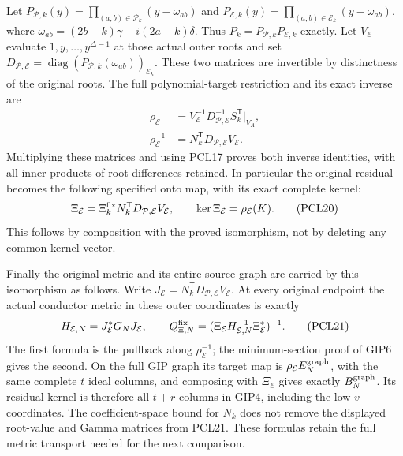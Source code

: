 Let
$P_{\mathcal P,k}(y)=\prod_{(a,b)\in\mathcal P_k}(y-\omega_{ab})$
and $P_{\mathcal E,k}(y)=\prod_{(a,b)\in\mathcal E_k}(y-\omega_{ab})$,
where $\omega_{ab}=(2b-k)\gamma-i(2a-k)\delta$. Thus
$P_k=P_{\mathcal P,k}P_{\mathcal E,k}$ exactly. Let
$V_{\mathcal E}$ evaluate $1,y,\ldots,y^{\Delta-1}$ at those
actual outer roots and set
$D_{\mathcal P,\mathcal E}=\operatorname{diag}
(P_{\mathcal P,k}(\omega_{ab}))_{\mathcal E_k}$. These two matrices
are invertible by distinctness of the original roots. The full
polynomial-target restriction and its exact inverse are
\[
 \begin{split}
 \rho_{\mathcal E}
 &=V_{\mathcal E}^{-1}D_{\mathcal P,\mathcal E}^{-1}
                         S_k^{\mathsf T}|_{V_A},\\
 \rho_{\mathcal E}^{-1}
 &=N_k^{\mathsf T}D_{\mathcal P,\mathcal E}V_{\mathcal E}.
 \end{split}\tag{PCL19}
\]
Multiplying these matrices and using PCL17 proves both inverse
identities, with all inner products of root differences retained.
In particular the original residual becomes the following
specified onto map, with its exact complete kernel:
\[
 \Xi_{\mathcal E}=\Xi_k^{\rm fix}
       N_k^{\mathsf T}D_{\mathcal P,\mathcal E}V_{\mathcal E},
 \qquad\ker\Xi_{\mathcal E}=\rho_{\mathcal E}(K).
 \tag{PCL20}
\]
This follows by composition with the proved isomorphism, not by
deleting any common-kernel vector.

Finally the original metric and its entire source graph are carried
by this isomorphism as follows. Write
$J_{\mathcal E}=N_k^{\mathsf T}D_{\mathcal P,\mathcal E}V_{\mathcal E}$.
At every original endpoint the actual conductor metric in these
outer coordinates is exactly
\[
 H_{\mathcal E,N}=J_{\mathcal E}^*G_NJ_{\mathcal E},\qquad
 Q_{\Xi,N}^{\rm fix}
     =(\Xi_{\mathcal E}H_{\mathcal E,N}^{-1}
                      \Xi_{\mathcal E}^*)^{-1}.
 \tag{PCL21}
\]
The first formula is the pullback along $\rho_{\mathcal E}^{-1}$;
the minimum-section proof of GIP6 gives the second. On the full
GIP graph its target map is
$\rho_{\mathcal E}E_N^{\rm graph}$, with the same complete
$t$ ideal columns, and composing with $\Xi_{\mathcal E}$ gives
exactly $B_N^{\rm graph}$. Its residual kernel is therefore all
$t+r$ columns in GIP4, including the low-$v$ coordinates.
The coefficient-space bound for $N_k$ does not remove the displayed
root-value and Gamma matrices from PCL21. These formulas retain
the full metric transport needed for the next comparison.


